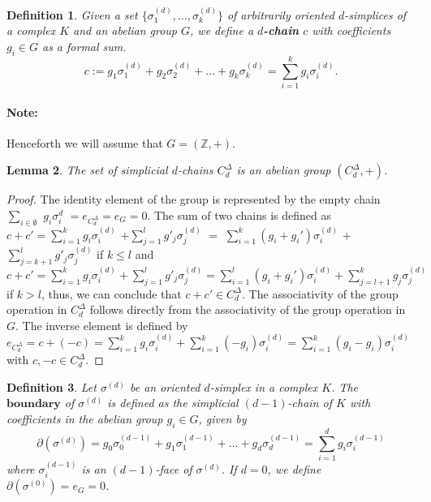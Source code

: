 \documentclass{amsart}
\newtheorem{definition}{Definition}[section]
\newtheorem{lemma}[definition]{Lemma}
\begin{document}
\begin{definition}
Given a set $\{\sigma_1^{(d)}, \ldots, \sigma_k^{(d)}\}$ of arbitrarily oriented $d$-simplices of a complex $K$ and an abelian group $G$, we define a \textbf{$d$-chain} $c$ with coefficients $g_i \in G$ as a formal sum.
\begin{equation}
c := g_1 \sigma^{(d)}_1 + g_2 \sigma^{(d)}_2 + \ldots + g_k \sigma^{(d)}_k = \sum_{i=1}^{k} g_i \sigma^{(d)}_i.
\end{equation}
\end{definition}

\paragraph{Note:} Henceforth we will assume that $G = (\mathbb{Z},+)$.

\begin{lemma}
The set of simplicial $d$-chains $C^\Delta_d$ is an abelian group $(C^\Delta_d,+)$.
\end{lemma}
\begin{proof}
The identity element of the group is represented by the empty chain $\sum_{i \in \emptyset}$ $g_i \sigma^{d}_i$ $= e_{C_d^\Delta} = e_G = 0$. The sum of two chains is defined as $c+c' = \sum_{i=1}^{k} g_i \sigma_i^{(d)}$ $+ \sum_{j=1}^{l} g'_j \sigma_j^{(d)}$ $=$ $\sum_{i=1}^{k} (g_i+g_i') \sigma_i^{(d)}$ $+$ $\sum_{j=k+1}^{l} g'_j \sigma_j^{(d)}$ if $k \leq l$ and $c+c' = \sum_{i=1}^{k} g_i \sigma_i^{(d)} + \sum_{j=1}^{l} g'_j \sigma_j^{(d)} = \sum_{i=1}^{l} (g_i+g_i') \sigma_i^{(d)} + \sum_{j=l+1}^{k} g_j \sigma_j^{(d)}$ if $k > l$, thus, we can conclude that $c+c' \in C^\Delta_d$. The associativity of the group operation in $C^\Delta_d$ follows directly from the associativity of the group operation in $G$. The inverse element is defined by $e_{C^\Delta_d} = c + (-c) = \sum_{i=1}^{k} g_i \sigma_i^{(d)} + \sum_{i=1}^{k} (-g_i) \sigma_i^{(d)} = \sum_{i=1}^{k} (g_i-g_i) \sigma_i^{(d)}$ with $c,-c \in C^\Delta_d$.
\end{proof}

\begin{definition}
Let $\sigma^{(d)}$ be an oriented $d$-simplex in a complex $K$. The $\textbf{boundary}$ of $\sigma^{(d)}$ is defined as the simplicial $(d-1)$-chain of $K$ with coefficients in the abelian group $g_i \in G$, given by
\begin{equation}
\partial(\sigma^{(d)}) = g_0 \sigma^{(d-1)}_0 + g_1 \sigma^{(d-1)}_1 + \ldots + g_d \sigma^{(d-1)}_d = \sum_{i=1}^{d} g_i \sigma^{(d-1)}_i
\end{equation}
where $\sigma^{(d-1)}_i$ is an $(d-1)$-face of $\sigma^{(d)}$. If $d=0$, we define $\partial(\sigma^{(0)}) = e_G = 0$.
\end{definition}
\end{document}
